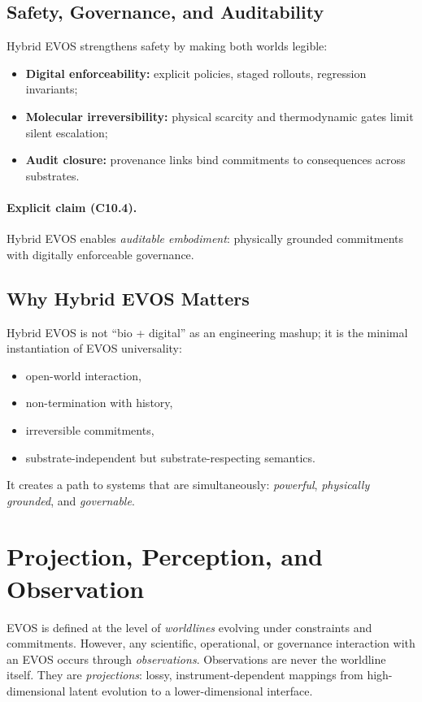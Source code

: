 \documentclass[11pt]{article}
\begin{document}
\subsection{Safety, Governance, and Auditability}
\label{sec:hybrid-safety-governance}

Hybrid EVOS strengthens safety by making both worlds legible:
\begin{itemize}
  \item \textbf{Digital enforceability:} explicit policies, staged rollouts, regression invariants;
  \item \textbf{Molecular irreversibility:} physical scarcity and thermodynamic gates limit silent escalation;
  \item \textbf{Audit closure:} provenance links bind commitments to consequences across substrates.
\end{itemize}

\paragraph{Explicit claim (C10.4).}
Hybrid EVOS enables \emph{auditable embodiment}: physically grounded commitments with
digitally enforceable governance.

\subsection{Why Hybrid EVOS Matters}
\label{sec:why-hybrid-matters}

Hybrid EVOS is not ``bio + digital'' as an engineering mashup; it is the minimal
instantiation of EVOS universality:
\begin{itemize}
  \item open-world interaction,
  \item non-termination with history,
  \item irreversible commitments,
  \item substrate-independent but substrate-respecting semantics.
\end{itemize}

It creates a path to systems that are simultaneously:
\emph{powerful}, \emph{physically grounded}, and \emph{governable}.

\section{Projection, Perception, and Observation}
\label{sec:projection}

EVOS is defined at the level of \emph{worldlines} evolving under constraints and commitments.
However, any scientific, operational, or governance interaction with an EVOS occurs through
\emph{observations}. Observations are never the worldline itself. They are \emph{projections}:
lossy, instrument-dependent mappings from high-dimensional latent evolution to a lower-dimensional
interface.
\end{document}

